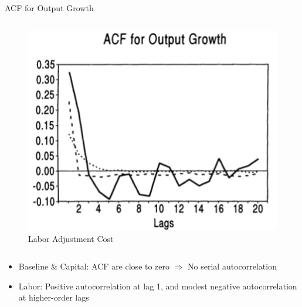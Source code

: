 \documentclass[10pt]{beamer}
\begin{document}
\begin{frame}{ACF for Output Growth}
\begin{columns}[T,onlytextwidth]
        \begin{figure}
            \centering
            \includegraphics[width=\linewidth]{figures/L_ACF.png}
            \caption{Labor Adjustment Cost}
        \end{figure}
    \end{columns}

    \begin{itemize}
        \item Baseline \& Capital: ACF are close to zero $\Rightarrow$ No serial
              autocorrelation
        \item Labor: Positive autocorrelation at lag 1, and modest negative autocorrelation
              at higher-order lags
    \end{itemize}

\end{frame}
\end{document}
